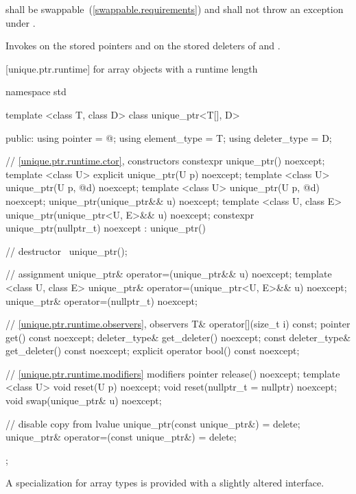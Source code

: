 \begin{itemdescr}
\pnum
\requires {} shall be
swappable~(\ref{swappable.requirements}) and shall
not throw an exception
under .

\pnum
\effects Invokes  on the stored pointers and on the stored
deleters of  and .
\end{itemdescr}

[unique.ptr.runtime]{ for array objects with a runtime length}

%
\begin{codeblock}
namespace std {
  template <class T, class D> class unique_ptr<T[], D> {
  public:
    using pointer      = @\seebelow@;
    using element_type = T;
    using deleter_type = D;

    // \ref{unique.ptr.runtime.ctor}, constructors
    constexpr unique_ptr() noexcept;
    template <class U> explicit unique_ptr(U p) noexcept;
    template <class U> unique_ptr(U p, @\seebelow@ d) noexcept;
    template <class U> unique_ptr(U p, @\seebelow@ d) noexcept;
    unique_ptr(unique_ptr&& u) noexcept;
    template <class U, class E>
      unique_ptr(unique_ptr<U, E>&& u) noexcept;
    constexpr unique_ptr(nullptr_t) noexcept : unique_ptr() { }

    // destructor
    ~unique_ptr();

    // assignment
    unique_ptr& operator=(unique_ptr&& u) noexcept;
    template <class U, class E>
      unique_ptr& operator=(unique_ptr<U, E>&& u) noexcept;
    unique_ptr& operator=(nullptr_t) noexcept;

    // \ref{unique.ptr.runtime.observers}, observers
    T& operator[](size_t i) const;
    pointer get() const noexcept;
    deleter_type& get_deleter() noexcept;
    const deleter_type& get_deleter() const noexcept;
    explicit operator bool() const noexcept;

    // \ref{unique.ptr.runtime.modifiers} modifiers
    pointer release() noexcept;
    template <class U> void reset(U p) noexcept;
    void reset(nullptr_t = nullptr) noexcept;
    void swap(unique_ptr& u) noexcept;

    // disable copy from lvalue
    unique_ptr(const unique_ptr&) = delete;
    unique_ptr& operator=(const unique_ptr&) = delete;
  };
}
\end{codeblock}

\pnum
A specialization for array types is provided with a slightly altered
interface.


